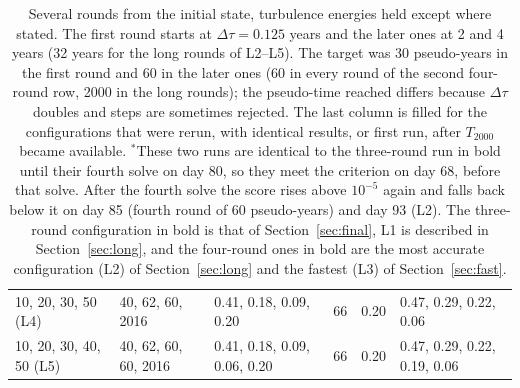 \documentclass{article}
\begin{document}
\begin{table}[h]
\begin{tabular}{l|l|l|r|r|l}
10, 20, 30, 50 (L4) & 40, 62, 60, 2016 & 0.41, 0.18, 0.09, 0.20 & 66 & 0.20 & 0.47, 0.29, 0.22, 0.06 \\
10, 20, 30, 40, 50 (L5) & 40, 62, 60, 60, 2016 & 0.41, 0.18, 0.09, 0.06, 0.20 & 66 & 0.20 & 0.47, 0.29, 0.22, 0.19, 0.06 \\
\bottomrule
\end{tabular}
\caption{Several rounds from the initial state, turbulence energies held except where stated. The first round starts at $\Delta\tau=0.125$ years and the later ones at 2 and 4 years (32 years for the long rounds of L2--L5). The target was 30 pseudo-years in the first round and 60 in the later ones (60 in every round of the second four-round row, 2000 in the long rounds); the pseudo-time reached differs because $\Delta\tau$ doubles and steps are sometimes rejected. The last column is filled for the configurations that were rerun, with identical results, or first run, after $T_{2000}$ became available. $^{*}$These two runs are identical to the three-round run in bold until their fourth solve on day 80, so they meet the criterion on day 68, before that solve. After the fourth solve the score rises above $10^{-5}$ again and falls back below it on day 85 (fourth round of 60 pseudo-years) and day 93 (L2). The three-round configuration in bold is that of Section~\ref{sec:final}, L1 is described in Section~\ref{sec:long}, and the four-round ones in bold are the most accurate configuration (L2) of Section~\ref{sec:long} and the fastest (L3) of Section~\ref{sec:fast}.}
\label{tab:rounds}
\end{table}
\end{document}
